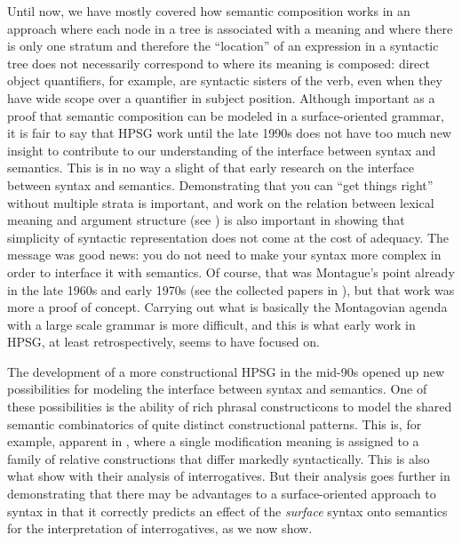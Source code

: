 \documentclass[output=paper
	        ,collection
	        ,collectionchapter
 	        ,biblatex
                ,babelshorthands
                ,newtxmath
                ,draftmode
                ,colorlinks, citecolor=brown
]{langscibook}
\begin{document}
Until now, we have mostly covered how semantic composition works in an approach where each node in a tree is associated with a meaning and where there is only one stratum and therefore the ``location'' of an expression in a syntactic tree does not necessarily correspond to where its meaning is composed: direct object quantifiers, for example, are syntactic sisters of the verb, even when they have wide scope over a quantifier in subject position. Although important as a proof that semantic composition can be modeled in a surface-oriented grammar, it is fair to say that HPSG work until the late 1990s does not have too much new insight to contribute to our understanding of the interface between syntax and semantics. This is in no way a slight of that early research on the interface between syntax and semantics. Demonstrating that you can ``get things right'' without multiple strata is important, and work on the relation between lexical meaning and argument structure (see ) is also important in showing that simplicity of syntactic representation does not come at the cost of adequacy. The message was good news: you do not need to make your syntax more complex in order to interface it with semantics. Of course, that was Montague's point already in the late 1960s and early 1970s (see the collected papers in \citealt{Montague1974}), but that work was more a proof of concept.  Carrying out what is basically the Montagovian agenda with a large scale grammar is more difficult, and this is what early work in HPSG, at least retrospectively, seems to have focused on.

The development of a more constructional HPSG in the mid-90s opened up new possibilities for modeling the interface between syntax and semantics. One of these possibilities is the ability of rich phrasal constructicons to model the shared semantic combinatorics of quite distinct constructional patterns. This is, for example, apparent in \citet{Sag1997}, where a single modification meaning is assigned to a family of relative constructions that differ markedly syntactically. This is also what \citet{GinzburgandSag2001} show with their analysis of interrogatives. But their analysis goes further in demonstrating that there may be advantages to a surface-oriented approach to syntax in that it correctly predicts an effect of the \emph{surface} syntax onto semantics for the interpretation of interrogatives, as we now show. 
\end{document}
